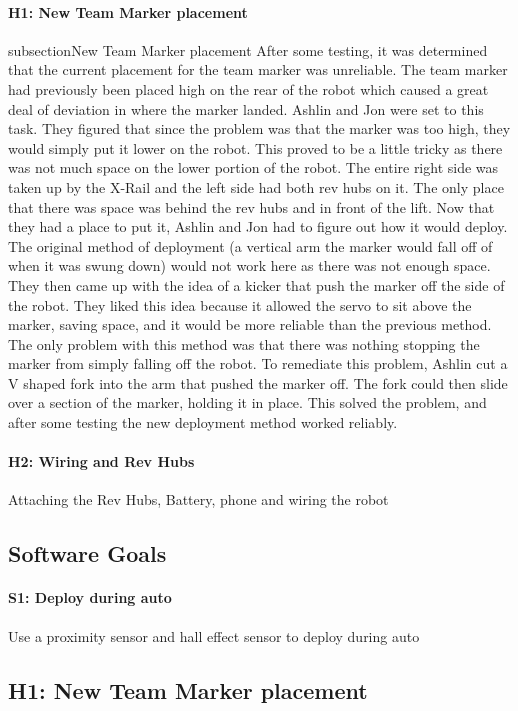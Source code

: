 \documentclass{article}
\begin{document}
\paragraph{H1: New Team Marker placement}
subsection{New Team Marker placement}
After some testing, it was determined that the current placement for the team marker was unreliable. The team marker had previously been placed high on the rear of the robot which caused a great deal of deviation in where the marker landed. Ashlin and Jon were set to this task. They figured that since the problem was that the marker was too high, they would simply put it lower on the robot. This proved to be a little tricky as there was not much space on the lower portion of the robot. The entire right side was taken up by the X-Rail and the left side had both rev hubs on it. The only place that there was space was behind the rev hubs and in front of the lift. Now that they had a place to put it, Ashlin and Jon had to figure out how it would deploy. The original method of deployment (a vertical arm the marker would fall off of when it was swung down) would not work here as there was not enough space. They then came up with the idea of a kicker that push the marker off the side of the robot. They liked this idea because it allowed the servo to sit above the marker, saving space, and it would be more reliable than the previous method. The only problem with this method was that there was nothing stopping the marker from simply falling off the robot. To remediate this problem, Ashlin cut a V shaped fork into the arm that pushed the marker off. The fork could then slide over a section of the marker, holding it in place. This solved the problem, and after some testing the new deployment method worked reliably. 

\paragraph{H2: Wiring and Rev Hubs}
 Attaching the Rev Hubs, Battery, phone and wiring the robot
\subsection{Software Goals}
\paragraph{S1: Deploy during auto}
 Use a proximity sensor and hall effect sensor to deploy during auto
\newpage
\subsection{H1: New Team Marker placement}
\end{document}
